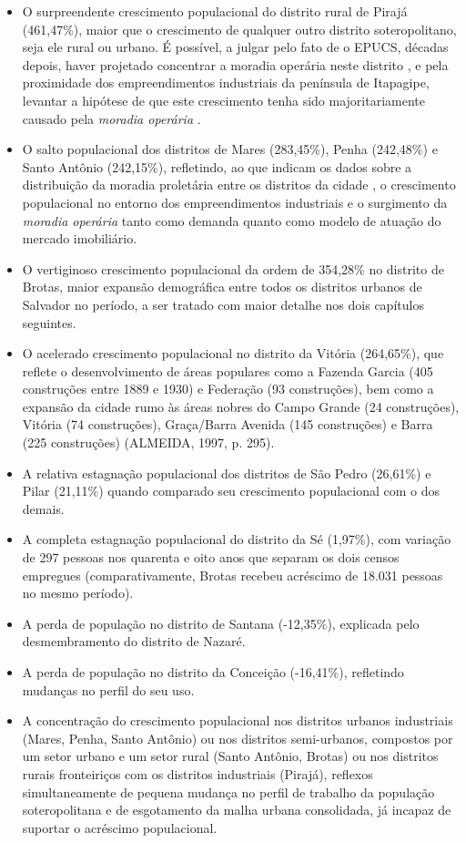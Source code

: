 \begin{itemize}
\item O surpreendente crescimento populacional do distrito rural de Pirajá (461,47\%), maior que o crescimento de qualquer outro distrito soteropolitano, seja ele rural ou urbano. É possível, a julgar pelo fato de o EPUCS, décadas depois, haver projetado concentrar a moradia operária neste distrito \cite{PREFEITURA1978,sampaio_formas_1999}, e pela proximidade dos empreendimentos industriais da península de Itapagipe, levantar a hipótese de que este crescimento tenha sido majoritariamente causado pela \textit{moradia operária} \cite{cardoso_vilas_1991}.
\item O salto populacional dos distritos de Mares (283,45\%), Penha (242,48\%) e Santo Antônio (242,15\%), refletindo, ao que indicam os dados sobre a distribuição da moradia proletária entre os distritos da cidade \cite[p.~126]{cardoso_vilas_1991}, o crescimento populacional no entorno dos empreendimentos industriais e o surgimento da \textit{moradia operária} tanto como demanda quanto como modelo de atuação do mercado imobiliário.
\item O vertiginoso crescimento populacional da ordem de 354,28\% no distrito de Brotas, maior expansão demográfica entre todos os distritos urbanos de Salvador no período, a ser tratado com maior detalhe nos dois capítulos seguintes.
\item O acelerado crescimento populacional no distrito da Vitória (264,65\%), que reflete o desenvolvimento de áreas populares como a Fazenda Garcia (405 construções entre 1889 e 1930) e Federação (93 construções), bem como a expansão da cidade rumo às áreas nobres do Campo Grande (24 construções), Vitória (74 construções), Graça/Barra Avenida (145 construções) e Barra (225 construções) (ALMEIDA, 1997, p. 295).
\item A relativa estagnação populacional dos distritos de São Pedro (26,61\%) e Pilar (21,11\%) quando comparado seu crescimento populacional com o dos demais. 
\item A completa estagnação populacional do distrito da Sé (1,97\%), com variação de 297 pessoas nos quarenta e oito anos que separam os dois censos empregues (comparativamente, Brotas recebeu acréscimo de 18.031 pessoas no mesmo período).
\item A perda de população no distrito de Santana (-12,35\%), explicada pelo desmembramento do distrito de Nazaré.
\item A perda de população no distrito da Conceição (-16,41\%), refletindo mudanças no perfil do seu uso.
\item A concentração do crescimento populacional nos distritos urbanos industriais (Mares, Penha, Santo Antônio) ou nos distritos semi-urbanos, compostos por um setor urbano e um setor rural (Santo Antônio, Brotas) ou nos distritos rurais fronteiriços com os distritos industriais (Pirajá), reflexos simultaneamente de pequena mudança no perfil de trabalho da população soteropolitana e de esgotamento da malha urbana consolidada, já incapaz de suportar o acréscimo populacional.
\end{itemize}

